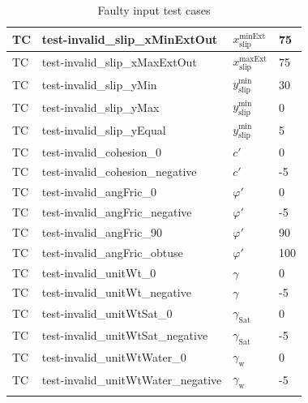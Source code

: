 \documentclass[12pt, titlepage]{article}
\newcounter{testnum} %
\begin{document}
\begin{longtable}{  l  p{5cm}  l  p{5cm}  }
	\hline
	TC{testnum}\thetestnum \label{TC_InvalidSlipXMinExtOut} & 
	test-invalid\_slip\_xMinExtOut & ${x_\text{slip}^\text{minExt}}$ & 75\\ 
	\hline
	TC{testnum}\thetestnum \label{TC_InvalidSlipXMaxExtOut} & 
	test-invalid\_slip\_xMaxExtOut & ${x_\text{slip}^\text{maxExt}}$ & 75\\ 
	\hline
	TC{testnum}\thetestnum \label{TC_InvalidSlipYMin} & 
	test-invalid\_slip\_yMin & ${y_\text{slip}^\text{min}}$ & 30\\ 
	\hline
	TC{testnum}\thetestnum \label{TC_InvalidSlipYMax} & 
	test-invalid\_slip\_yMax & ${y_\text{slip}^\text{min}}$ & 0\\ 
	\hline
	TC{testnum}\thetestnum \label{TC_InvalidSlipYEqual} & 
	test-invalid\_slip\_yEqual & ${y_\text{slip}^\text{min}}$ & 5\\ 
	\hline
	TC{testnum}\thetestnum \label{TC_InvalidCohesion0} & 
	test-invalid\_cohesion\_0 & $c'$ & 0\\ 
	\hline
	TC{testnum}\thetestnum \label{TC_InvalidCohesionNegative} & 
	test-invalid\_cohesion\_negative & $c'$ & -5\\ 
	\hline
	TC{testnum}\thetestnum \label{TC_InvalidAngFric0} & 
	test-invalid\_angFric\_0 & $\varphi'$ & 0\\ 
	\hline
	TC{testnum}\thetestnum \label{TC_InvalidAngFricNegative} & 
	test-invalid\_angFric\_negative & $\varphi'$ & -5\\ 
	\hline
	TC{testnum}\thetestnum \label{TC_InvalidAngFric90} & 
	test-invalid\_angFric\_90 & $\varphi'$ & 90\\ 
	\hline
	TC{testnum}\thetestnum \label{TC_InvalidAngFricObtuse} & 
	test-invalid\_angFric\_obtuse & $\varphi'$ & 100\\ 
	\hline
	TC{testnum}\thetestnum \label{TC_InvalidUnitWt0} & 
	test-invalid\_unitWt\_0 & $\gamma$ & 0\\ 
	\hline
	TC{testnum}\thetestnum \label{TC_InvalidUnitWtNegative} & 
	test-invalid\_unitWt\_negative & $\gamma$ & -5\\ 
	\hline
	TC{testnum}\thetestnum \label{TC_InvalidUnitWtSat0} & 
	test-invalid\_unitWtSat\_0 & $\gamma_\text{Sat}$ & 0\\ 
	\hline
	TC{testnum}\thetestnum \label{TC_InvalidUnitWtSatNegative} & 
	test-invalid\_unitWtSat\_negative & $\gamma_\text{Sat}$ & -5\\ 
	\hline
	TC{testnum}\thetestnum \label{TC_InvalidUnitWtWater0} & 
	test-invalid\_unitWtWater\_0 & $\gamma_\text{w}$ & 0\\ 
	\hline
	TC{testnum}\thetestnum \label{TC_InvalidUnitWtWaterNegative} 
	& test-invalid\_unitWtWater\_negative & $\gamma_\text{w}$ & -5\\ 
	\hline
	\caption{Faulty input test cases}
	\label{FaultyInputTests}
\end{longtable}
\end{document}
